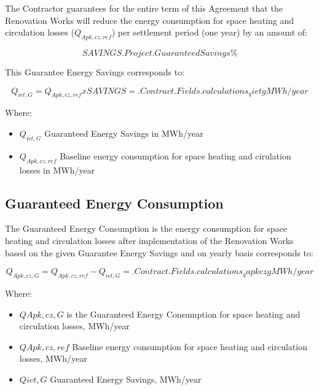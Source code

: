 The Contractor guarantees for the entire term of this Agreement that the
Renovation Works will reduce the energy consumption for space heating and
circulation losses ($Q_{Apk,cz,ref}$) per settlement period (one year) by an amount
of:

\[SAVINGS \iffalse input project.savings value="{{.Project.GuaranteedSavings}}" \fi {{.Project.GuaranteedSavings}} \%\]

This Guarantee Energy Savings corresponds to:

\[Q_{iet,G} = Q_{Apk, cz, ref} x SAVINGS = {{.Contract.Fields.calculations_qietg}} MWh/year\]

Where:

\begin{itemize}
	\item $Q_{iet,G}$	Guaranteed Energy Savings in MWh/year
	\item $Q_{Apk,cz,ref}$	Baseline energy consumption for space heating and cirulation losses in MWh/year
\end{itemize}

\subsection{Guaranteed Energy Consumption}
The Guaranteed Energy Consumption is the energy consumption for space heating
and circulation losses after implementation of the Renovation Works based on
the given Guarantee Energy Savings and on yearly basis corresponds to:

\[Q_{Apk,cz,G} = Q_{Apk,cz,ref} - Q_{iet,G} = {{.Contract.Fields.calculations_qapkczg}} MWh/year\]

Where:

\begin{itemize}
	\item $QApk,cz,G$	is the Guaranteed Energy Consumption for space heating and circulation losses, MWh/year
	\item $QApk,cz,ref$	Baseline energy consumption for space heating and circulation losses, MWh/year
	\item $Qiet,G$	Guaranteed Energy Savings, MWh/year
\end{itemize}
